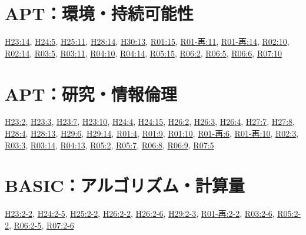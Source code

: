\section{APT：環境・持続可能性}
\hyperref[q:h23-reg-apt-14]{H23:14}, \hyperref[q:h24-reg-apt-05]{H24:5}, \hyperref[q:h25-reg-apt-11]{H25:11}, \hyperref[q:h28-reg-apt-14]{H28:14}, \hyperref[q:h30-reg-apt-13]{H30:13}, \hyperref[q:r01-reg-apt-15]{R01:15}, \hyperref[q:r01-ret-apt-11]{R01-再:11}, \hyperref[q:r01-ret-apt-14]{R01-再:14}, \hyperref[q:r02-reg-apt-10]{R02:10}, \hyperref[q:r02-reg-apt-14]{R02:14}, \hyperref[q:r03-reg-apt-05]{R03:5}, \hyperref[q:r03-reg-apt-11]{R03:11}, \hyperref[q:r04-reg-apt-10]{R04:10}, \hyperref[q:r04-reg-apt-14]{R04:14}, \hyperref[q:r05-reg-apt-15]{R05:15}, \hyperref[q:r06-reg-apt-02]{R06:2}, \hyperref[q:r06-reg-apt-05]{R06:5}, \hyperref[q:r06-reg-apt-06]{R06:6}, \hyperref[q:r07-reg-apt-10]{R07:10}
\section{APT：研究・情報倫理}
\hyperref[q:h23-reg-apt-02]{H23:2}, \hyperref[q:h23-reg-apt-03]{H23:3}, \hyperref[q:h23-reg-apt-07]{H23:7}, \hyperref[q:h23-reg-apt-10]{H23:10}, \hyperref[q:h24-reg-apt-04]{H24:4}, \hyperref[q:h24-reg-apt-15]{H24:15}, \hyperref[q:h26-reg-apt-02]{H26:2}, \hyperref[q:h26-reg-apt-03]{H26:3}, \hyperref[q:h26-reg-apt-04]{H26:4}, \hyperref[q:h27-reg-apt-07]{H27:7}, \hyperref[q:h27-reg-apt-08]{H27:8}, \hyperref[q:h28-reg-apt-04]{H28:4}, \hyperref[q:h28-reg-apt-13]{H28:13}, \hyperref[q:h29-reg-apt-06]{H29:6}, \hyperref[q:h29-reg-apt-14]{H29:14}, \hyperref[q:r01-reg-apt-04]{R01:4}, \hyperref[q:r01-reg-apt-09]{R01:9}, \hyperref[q:r01-reg-apt-10]{R01:10}, \hyperref[q:r01-ret-apt-06]{R01-再:6}, \hyperref[q:r01-ret-apt-10]{R01-再:10}, \hyperref[q:r02-reg-apt-03]{R02:3}, \hyperref[q:r03-reg-apt-03]{R03:3}, \hyperref[q:r03-reg-apt-14]{R03:14}, \hyperref[q:r04-reg-apt-13]{R04:13}, \hyperref[q:r05-reg-apt-02]{R05:2}, \hyperref[q:r05-reg-apt-07]{R05:7}, \hyperref[q:r06-reg-apt-08]{R06:8}, \hyperref[q:r06-reg-apt-09]{R06:9}, \hyperref[q:r07-reg-apt-05]{R07:5}
\section{BASIC：アルゴリズム・計算量}
\hyperref[q:h23-reg-basic-2-2]{H23:2-2}, \hyperref[q:h24-reg-basic-2-5]{H24:2-5}, \hyperref[q:h25-reg-basic-2-2]{H25:2-2}, \hyperref[q:h26-reg-basic-2-2]{H26:2-2}, \hyperref[q:h26-reg-basic-2-6]{H26:2-6}, \hyperref[q:h29-reg-basic-2-3]{H29:2-3}, \hyperref[q:r01-ret-basic-2-2]{R01-再:2-2}, \hyperref[q:r03-reg-basic-2-6]{R03:2-6}, \hyperref[q:r05-reg-basic-2-2]{R05:2-2}, \hyperref[q:r06-reg-basic-2-5]{R06:2-5}, \hyperref[q:r07-reg-basic-2-6]{R07:2-6}
